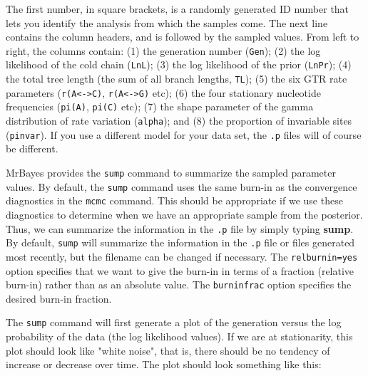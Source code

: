 \documentclass[12pt]{book}
\begin{document}
The first number, in square brackets, is a randomly generated ID number that lets you identify the
analysis from which the samples come. The next line contains the column headers, and is followed by
the sampled values. From left to right, the columns contain: (1) the generation number
(\texttt{Gen}); (2) the log likelihood of the cold chain (\texttt{LnL}); (3) the log likelihood of
the prior (\texttt{LnPr});
(4) the total tree length (the sum of all branch lengths, \texttt{TL}); (5) the six GTR rate
parameters (\texttt{r(A<->C)}, \texttt{r(A<->G)} etc); (6) the four stationary nucleotide
frequencies (\texttt{pi(A)}, \texttt{pi(C)} etc); (7) the shape parameter of the gamma distribution
of rate variation (\texttt{alpha}); and (8) the proportion of invariable sites (\texttt{pinvar}).
If you use a different model for your data set, the \texttt{.p} files will of course be different.

MrBayes provides the \texttt{sump} command to summarize the sampled parameter values. By default,
the \texttt{sump} command uses the same burn-in as the convergence diagnostics in the \texttt{mcmc}
command.  This should be appropriate if we use these diagnostics to determine when we have an
appropriate sample from the posterior. Thus, we can summarize the information in the \texttt{.p}
file by simply typing \textbf{sump}. By default, \texttt{sump} will summarize the information in
the \texttt{.p} file or files generated most recently, but the filename can be changed if
necessary. The \texttt{relburnin=yes} option specifies that we want to give the burn-in in terms of
a fraction (relative burn-in) rather than as an absolute value. The \texttt{burninfrac} option
specifies the desired burn-in fraction.

The \texttt{sump} command will first generate a plot of the generation versus the log probability
of the data (the log likelihood values). If we are at stationarity, this plot should look like
"white noise", that is, there should be no tendency of increase or decrease over time. The plot
should look something like this:
\end{document}
